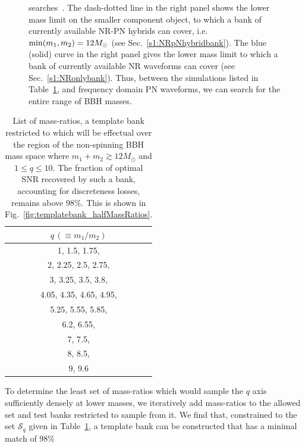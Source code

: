 \begin{figure}
\begin{center}
{  searches~\cite{CompTemplates2009,Brown:2012nn}. The dash-dotted line
  in the right panel shows the lower mass limit on the smaller component object,
  to which a bank of currently available NR-PN hybrids can cover, i.e.
  $\mathrm{min}(m_1,m_2)=12M_\odot$ (see Sec.~\ref{s1:NRpNhybridbank}). The blue (solid)
  curve in  the right panel gives the lower mass limit to which a bank of
  currently available NR waveforms can cover (see Sec.~\ref{s1:NRonlybank}).
  Thus, between the simulations listed in Table~\ref{table:fullqlist}, 
  and frequency domain PN waveforms, we can search for the entire range of 
  BBH masses.}
\end{center}
\end{figure}
\begin{table}
\begin{center}
\begin{tabular}{| c |}
\hline
$q\,(\equiv m_1/m_2)$ \\ \hline
1, 1.5, 1.75, \\
2, 2.25, 2.5, 2.75, \\
3, 3.25, 3.5, 3.8, \\
4.05, 4.35, 4.65, 4.95, \\
5.25, 5.55, 5.85, \\
6.2, 6.55, \\
7, 7.5, \\
8, 8.5, \\
9, 9.6 \\
\hline
\end{tabular}
\caption{List of mass-ratios, a template bank restricted to which will be effectual
over the region of the non-spinning BBH mass space where $m_1+m_2\gtrsim 12M_\odot$
and $1\leq q\leq 10$. The fraction of optimal SNR recovered by such a bank,
accounting for discreteness losses, remains above $98\%$. This is shown in
Fig.~\ref{fig:templatebank_halfMassRatios}.}
\label{table:fullqlist}
\end{center}
\end{table}
To determine the least set of mass-ratios which would sample the $q$ axis 
sufficiently densely at lower masses, we iteratively add mass-ratios to the 
allowed set and test banks restricted to sample from it. We find that, 
constrained to the set $\mathcal{S}_q$ given in Table~\ref{table:fullqlist},
a template bank can be constructed that has a minimal match of $98\%$
